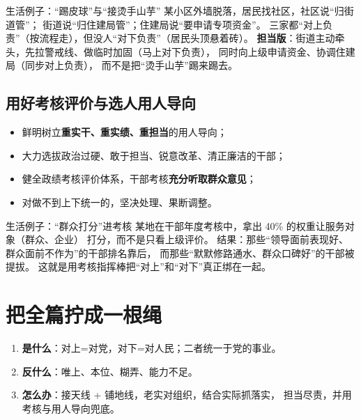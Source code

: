 \documentclass[11pt,a4paper]{ctexart}
\begin{document}
\begin{exampleblock}{生活例子：``踢皮球''与``接烫手山芋''}
某小区外墙脱落，居民找社区，社区说``归街道管''；
街道说``归住建局管''；住建局说``要申请专项资金''。
三家都``对上负责''（按流程走），但没人``对下负责''（居民头顶悬着砖）。
\textbf{担当版}：街道主动牵头，先拉警戒线、做临时加固（马上对下负责），
同时向上级申请资金、协调住建局（同步对上负责），
而不是把``烫手山芋''踢来踢去。
\end{exampleblock}

\subsection{用好考核评价与选人用人导向}

\begin{actionblock}
\begin{itemize}
  \item 鲜明树立\textbf{重实干、重实绩、重担当}的用人导向；
  \item 大力选拔政治过硬、敢于担当、锐意改革、清正廉洁的干部；
  \item 健全政绩考核评价体系，干部考核\textbf{充分听取群众意见}；
  \item 对做不到上下统一的，坚决处理、果断调整。
\end{itemize}
\end{actionblock}

\begin{exampleblock}{生活例子：``群众打分''进考核}
某地在干部年度考核中，拿出 40\% 的权重让服务对象（群众、企业）
打分，而不是只看上级评价。
结果：那些``领导面前表现好、群众面前不作为''的干部排名靠后，
而那些``默默修路通水、群众口碑好''的干部被提拔。
这就是用考核指挥棒把``对上''和``对下''真正绑在一起。
\end{exampleblock}

\section{把全篇拧成一根绳}

\begin{enumerate}[label=\textbf{\arabic*.}]
  \item \textbf{是什么}：对上=对党，对下=对人民；二者统一于党的事业。
  \item \textbf{反什么}：唯上、本位、糊弄、能力不足。
  \item \textbf{怎么办}：接天线 + 铺地线，老实对组织，结合实际抓落实，
        担当尽责，并用考核与用人导向兜底。
\end{enumerate}
\end{document}
